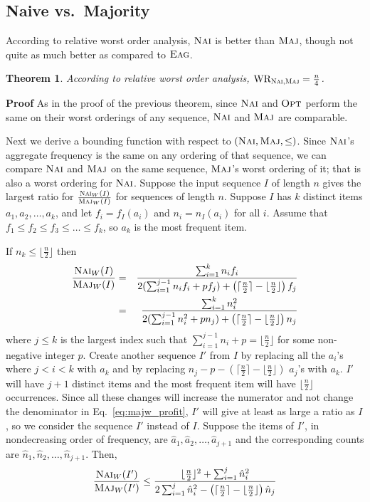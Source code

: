 \documentclass[11pt]{article}
\newtheorem{xtheorem}{Theorem}
\newenvironment{theorem}{\begin{xtheorem}\rm}{\end{xtheorem}}
\newenvironment{proof}{\begin{trivlist}\item[]{\bf Proof }}{\hspace*{\fill}\raisebox{-1pt}{\boldmath$\Box$}\end{trivlist}}
\newcommand{\opt}{{\ensuremath{\textsc{Opt}}}\xspace}
\newcommand{\maj}{{\ensuremath{\textsc{Maj}}}\xspace}
\newcommand{\nav}{{\ensuremath{\textsc{Nai}}}\xspace}
\newcommand{\eag}{{\ensuremath{\textsc{Eag}}}\xspace}
\DeclareMathOperator{\WR}{\textrm{WR}}
\begin{document}
\subsection{Naive vs.\ Majority}

According to relative worst order analysis, \nav is better than
\maj, though not quite as much better as compared to \eag.

\begin{theorem}\label{thm:relwor_nav_maj}
According to relative worst order analysis, $\WR_{{\nav},{\maj}} = \frac{n}{4}$.
\end{theorem}
\begin{proof}
As in the proof of the previous theorem,
since \nav and \opt perform the same on their worst orderings
of any sequence, \nav and \maj are comparable.



Next we  derive a bounding function with respect to $(\nav,\maj,\leq)$.
Since \nav's aggregate frequency is the same on any ordering of that
sequence, we can compare \nav and \maj on the same sequence, \maj's
worst ordering of it; that is also a worst ordering for \nav.
Suppose the input sequence $I$ of length $n$ gives the largest ratio
for $\frac{\nav_W(I)}{\maj_W(I)}$ for sequences of length $n$.
Suppose $I$ has $k$ distinct items $a_1, a_2,\ldots, a_k$, and let $f_i=f_I(a_i)$ and $n_i = n_I(a_i)$
for all $i$.
Assume that $f_1 \leq f_2 \leq f_3 \leq \ldots \leq f_k$, so $a_k$ is the most frequent item.


If $n_k\leq \lfloor \frac{n}{2} \rfloor$ then
\begin{eqnarray}
\frac{\nav_W(I)}{\maj_W(I)} &=& \frac{\sum_{i=1}^k n_if_i}{2(\sum_{i=1}^{j-1}n_if_i + pf_j) + \left (\lceil \frac{n}{2} \rceil - \lfloor \frac{n}{2} \rfloor \right) f_j} \nonumber
\\
&=& \frac{\sum_{i=1}^k n_i^2}{2(\sum_{i=1}^{j-1}n_i^2 + pn_j) + \left (\lceil \frac{n}{2} \rceil - \lfloor \frac{n}{2} \rfloor \right) n_j} \label{eq:majw_profit}
\end{eqnarray}
where $j\leq k$ is the largest index such that $\sum_{i=1}^{j-1}n_i + p = \lfloor \frac{n}{2} \rfloor$ for some non-negative integer $p$.
Create another sequence $I'$ from $I$ by replacing all the $a_i$'s where $j<i<k$ with $a_k$ and by replacing $n_j - p - \left (\lceil \frac{n}{2} \rceil - \lfloor \frac{n}{2} \rfloor \right)$ $a_j$'s with $a_k$.
$I'$ will have $j+1$ distinct items and the most frequent item will have $\lfloor \frac{n}{2} \rfloor$ occurrences.
Since all these changes will increase the numerator and not change the denominator in Eq.~\ref{eq:majw_profit}, $I'$ will give at least as large a ratio as $I$, so we consider the sequence $I'$ instead of $I$.
Suppose the items of $I'$, in nondecreasing order of frequency, are $\hat{a}_1, \hat{a}_2,\ldots ,\hat{a}_{j+1}$ and the corresponding counts are $\hat{n}_1, \hat{n}_2,\ldots ,\hat{n}_{j+1}$. Then,
\begin{equation}
\frac{\nav_W(I')}{\maj_W(I')} \leq \frac{\lfloor \frac{n}{2} \rfloor^2 + \sum_{i=1}^j \hat{n}_i^2}{2\sum_{i=1}^{j}\hat{n}_i^2  - \left (\lceil \frac{n}{2} \rceil - \lfloor \frac{n}{2} \rfloor  \right) \hat{n}_j }\label{eq:majw_profit2}
\end{equation}


\end{proof}
\end{document}
